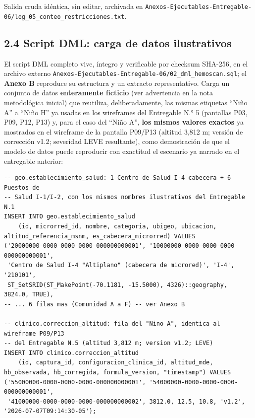 \documentclass[11pt,a4paper]{article}
\begin{document}
Salida cruda idéntica, sin editar, archivada en \texttt{Anexos-Ejecutables-Entregable-06/log\_05\_conteo\_restricciones.txt}.

\subsection{2.4 Script DML: carga de datos ilustrativos}\label{script-dml-carga-de-datos-ilustrativos}

El script DML completo vive, íntegro y verificable por checksum SHA-256, en el archivo externo \texttt{Anexos-Ejecutables-Entregable-06/02\_dml\_hemoscan.sql}; el \textbf{Anexo B} reproduce su estructura y un extracto representativo. Carga un conjunto de datos \textbf{enteramente ficticio} (ver advertencia en la nota metodológica inicial) que reutiliza, deliberadamente, las mismas etiquetas ``Niño A'' a ``Niño H'' ya usadas en los wireframes del Entregable N.° 5 (pantallas P03, P09, P12, P13) y, para el caso del ``Niño A'', \textbf{los mismos valores exactos} ya mostrados en el wireframe de la pantalla P09/P13 (altitud 3,812 m; versión de corrección v1.2; severidad LEVE resultante), como demostración de que el modelo de datos puede reproducir con exactitud el escenario ya narrado en el entregable anterior:

\begin{samepage}\begin{verbatim}
-- geo.establecimiento_salud: 1 Centro de Salud I-4 cabecera + 6 Puestos de
-- Salud I-1/I-2, con los mismos nombres ilustrativos del Entregable N.1
INSERT INTO geo.establecimiento_salud
    (id, microrred_id, nombre, categoria, ubigeo, ubicacion, altitud_referencia_msnm, es_cabecera_microrred) VALUES
('20000000-0000-0000-0000-000000000001', '10000000-0000-0000-0000-000000000001',
 'Centro de Salud I-4 "Altiplano" (cabecera de microred)', 'I-4', '210101',
 ST_SetSRID(ST_MakePoint(-70.1181, -15.5000), 4326)::geography, 3824.0, TRUE),
-- ... 6 filas mas (Comunidad A a F) -- ver Anexo B

-- clinico.correccion_altitud: fila del "Nino A", identica al wireframe P09/P13
-- del Entregable N.5 (altitud 3,812 m; version v1.2; LEVE)
INSERT INTO clinico.correccion_altitud
    (id, captura_id, configuracion_clinica_id, altitud_mde, hb_observada, hb_corregida, formula_version, "timestamp") VALUES
('55000000-0000-0000-0000-000000000001', '54000000-0000-0000-0000-000000000001',
 '41000000-0000-0000-0000-000000000002', 3812.0, 12.5, 10.8, 'v1.2', '2026-07-07T09:14:30-05');
\end{verbatim}\end{samepage}
\end{document}
